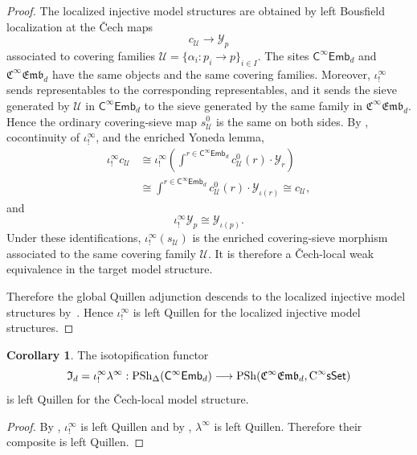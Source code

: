 \documentclass{amsart}
\newcommand{\cat}[1]{\mathsf{#1}}
\newcommand{\sset}{\cat{sSet}}
\newcommand{\CsSet}{\textnormal{C}^{\infty}\sset}
\newcommand{\fembnoniso}[1]{\cat{C}^{\infty}\cat{Emb}_{#1}}
\newcommand{\femb}[1]{\mathfrak{C}^{\infty}\mathfrak{Emb}_{#1}}
\newcommand{\psh}{\mathrm{PSh}}
\newcommand{\spsh}{\mathrm{PSh}_{\Delta}}
\newcommand{\Yo}{\mathscr{Y}}
\theoremstyle{definition}
\newtheorem{corollary}[equation]{Corollary}
\numberwithin{equation}{subsection}
\numberwithin{subsubsection}{subsection}
\begin{document}
\begin{proof}
  The localized injective model structures are obtained by left Bousfield
  localization at the \v{C}ech maps
  \[
    c_{\mathcal{U}}\longrightarrow \Yo_p
  \]
  associated to covering families
  \(\mathcal{U}=\{\alpha_i:p_i\to p\}_{i\in I}\). The sites
  \(\fembnoniso{d}\) and \(\femb{d}\) have the same objects and the same
  covering families. Moreover, \(\iota_{!}^{\infty}\) sends representables to
  the corresponding representables, and it sends the sieve generated by
  \(\mathcal{U}\) in \(\fembnoniso{d}\) to the sieve generated by the same
  family in \(\femb{d}\). Hence the
  ordinary covering-sieve map \(s_{\mathcal{U}}^{0}\) is the same on both sides.
  By , cocontinuity of
  \(\iota_{!}^{\infty}\), and the enriched Yoneda lemma,
  \[
    \begin{aligned}
      \iota_{!}^{\infty}c_{\mathcal{U}}
      &\cong
      \iota_{!}^{\infty}
      \left(
        \int^{r\in\fembnoniso{d}}
        c_{\mathcal{U}}^{0}(r)\cdot\Yo_r
      \right)\\
      &\cong
      \int^{r\in\fembnoniso{d}}
      c_{\mathcal{U}}^{0}(r)\cdot\Yo_{\iota(r)}
      \cong
      c_{\mathcal{U}},
    \end{aligned}
  \]
  and
  \[
    \iota_{!}^{\infty}\Yo_p\cong\Yo_{\iota(p)}.
  \]
  Under these identifications,
  \(\iota_{!}^{\infty}(s_{\mathcal{U}})\) is the enriched covering-sieve
  morphism associated to the same covering family \(\mathcal{U}\). It is
  therefore a \v{C}ech-local weak equivalence in the target model structure.

  Therefore the global Quillen adjunction descends to the localized injective
  model structures by~\cite[Proposition~3.3.18(1)]{Hir03}. Hence
  \(\iota_{!}^{\infty}\) is left Quillen for the localized
  injective model structures.
\end{proof}

\begin{corollary}\label{cor:isotop.is.left.quillen}
  The isotopification functor
  \[
    \mathfrak{I}_d=\iota_{!}^{\infty}\lambda^\infty:
    \spsh(\fembnoniso{d})\longrightarrow
    \psh(\femb{d},\CsSet)
  \]
  is left Quillen for the \v{C}ech-local model structure.
\end{corollary}

\begin{proof}
  By , \(\iota_{!}^{\infty}\) is left Quillen and
  by , \(\lambda^{\infty}\) is left
  Quillen. Therefore their composite is left Quillen.
\end{proof}
\end{document}
